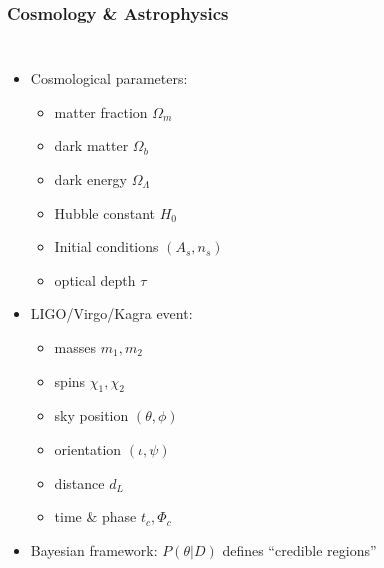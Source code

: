 \documentclass[aspectratio=169]{beamer}
\begin{document}
\begin{frame}
    \frametitle{Cosmology \& Astrophysics}
    \begin{columns}
        \begin{itemize}
            \item Cosmological parameters:%
                \begin{itemize}
                    \item matter fraction $\Omega_m$
                    \item dark matter $\Omega_b$
                    \item dark energy $\Omega_\Lambda$
                    \item Hubble constant $H_0$
                    \item Initial conditions $(A_s, n_s)$
                    \item optical depth $\tau$
                \end{itemize}
            \item LIGO/Virgo/Kagra event:%
                \begin{itemize}
                    \item masses $m_1, m_2$
                    \item spins $\chi_1, \chi_2$
                    \item sky position $(\theta, \phi)$
                    \item orientation $(\iota, \psi)$
                    \item distance $d_L$
                    \item time \& phase $t_c, \Phi_c$
                \end{itemize}
            \item Bayesian framework: $P(\theta|D)$ defines ``credible regions''
        \end{itemize}
        

\end{columns}
\end{frame}
\end{document}
